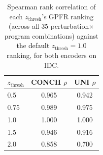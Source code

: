 \begin{table}[t]
\centering
\caption{Spearman rank correlation of each $z_{\text{thresh}}$'s GPFR ranking (across all 35 perturbation$\times$program combinations) against the default $z_{\text{thresh}}=1.0$ ranking, for both encoders on IDC.}
\label{tab:z_sensitivity}
\begin{tabular}{lcc}
\toprule
$z_{\text{thresh}}$ & CONCH $\rho$ & UNI $\rho$ \\
\midrule
0.5 & 0.965 & 0.942 \\
0.75 & 0.989 & 0.975 \\
1.0 & 1.000 & 1.000 \\
1.5 & 0.946 & 0.916 \\
2.0 & 0.858 & 0.700 \\
\bottomrule
\end{tabular}
\end{table}
